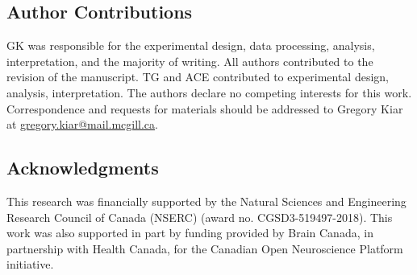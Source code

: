 \documentclass[10pt]{SelfArx} %
\begin{document}
\subsection*{Author Contributions}
GK was responsible for the experimental design, data processing, analysis, interpretation, and the majority of writing.
All authors contributed to the revision of the manuscript. TG and ACE contributed to experimental design, analysis,
interpretation. The authors declare no competing interests for this work. Correspondence and requests for materials
should be addressed to Gregory Kiar at \url{gregory.kiar@mail.mcgill.ca}.

\subsection*{Acknowledgments} 
This research was financially supported by the Natural Sciences and Engineering Research Council of Canada (NSERC)
(award no. CGSD3-519497-2018). This work was also supported in part by funding provided by Brain Canada, in partnership
with Health Canada, for the Canadian Open Neuroscience Platform initiative.



\end{document}

